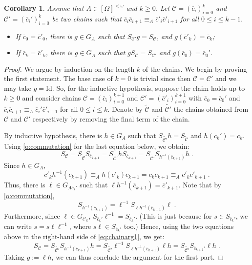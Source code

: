 \documentclass{article}
\newtheorem{corollary}[theorem]{Corollary}
\theoremstyle{remark}
\theoremstyle{definition}
\newcommand{\nn}[0]{S}%
\newcommand{\C}[0]{\mathcal{C}}
\newcommand{\fps}[1]{[#1]^{<\omega}}
\newcommand{\orq}[0]{\equiv}
\renewcommand\leq{\leqslant}
\renewcommand\geq{\geqslant}
\begin{document}
{{{{{  \begin{corollary}
  	\label{change chains} Assume that $A\in\fps{\Omega}$ and $k\geq 0$. {Let $\C=(\overline{c}_{i})_{i=0}^{k}$  and $\C'=(\overline{c}_{i}')_{i=0}^{k}$ be two chains such that $\overline{c}_{i}\overline{c}_{i+1}\orq_{A} \overline{c}'_{i}\overline{c}'_{i+1}$ for all $0\leq i\leq k-1$.}
    \begin{itemize}
     \item {If $\overline{c}_{0}=\overline{c}'_{0}$, there is $g\in G_{A}$ such that $\nn_{\C'}g=\nn_{\C}$, and $g(\overline{c}'_{k})=\overline{c}_k$;}
        \item {If $\overline{c}_{k}=\overline{c}'_{k}$, there is $g\in G_{A}$ such that $g\nn_{\C}=\nn_{\C'}$ and $g(\overline{c}_{0})=\overline{c}_0'$.}
    \end{itemize}
    
  
  \end{corollary}
  \begin{proof}
  {We argue by induction on the length $k$ of the chains. We begin by proving the first statement. The base case of $k=0$ is trivial since then $\C=\C'$ and we may take $g=\mathrm{Id}$. So, for the inductive hypothesis, suppose the claim holds up to $k\geq 0$ and consider chains $\C=(\overline{c}_{i})_{i=0}^{k+1}$ and $\C'=(\overline{c}'_{i})_{i=0}^{k+1}$ with $\overline{c}_{0}=\overline{c}_{0}'$ and $\overline{c}_{i}\overline{c}_{i+1}\orq_{A} \overline{c}_{i}'\overline{c}'_{i+1}$ for all $0\leq i\leq k$. Denote by $\tilde{\C}$ and $\tilde{\C'}$ the chains obtained from $\C$ and $\C'$ respectively by removing the final term of the chain.}
  
  {By inductive hypothesis, there is $h\in G_A$ such that $\nn_{\tilde{\C'}} h=\nn_{\tilde{\C}}$ and $h(\overline{c}_k')=\overline{c}_k$. Using \cref{o:commutation} for the last equation below, we obtain:}
\begin{equation}\label{eq:chainarg1}
\nn_{\C}=\nn_{\tilde{\C}}\nn_{\overline{c}_{k+1}}=\nn_{\tilde{\C'}}h\nn_{\overline{c}_{k+1}}=\nn_{\tilde{\C'}}\nn_{h^{-1}(\overline{c}_{k+1})}h\;.  
\end{equation}
Since $h\in G_A$,
\[\overline{c}'_k h^{-1}(\overline{c}_{k+1})\equiv_A h(\overline{c}'_k) \overline{c}_{k+1}=\overline{c}_k \overline{c}_{k+1}\equiv_A \overline{c}'_k \overline{c}'_{k+1}\;.\]
{Thus, there is $\ell\in G_{A \overline{c}_k'}$ such that $\ell h^{-1} (\overline{c}_{k+1})=\overline{c}'_{k+1}$. Note that by \cref{o:commutation},} 
\[\nn_{h^{-1}(\overline{c}_{k+1})}=\ell^{-1}\nn_{\ell h^{-1}(\overline{c}_{k+1})} \ell\;.\]
{Furthermore, since $\ell\in G_{\overline{c}'_k}$, $\nn_{\overline{c}_k'} \ell^{-1}=\nn_{\overline{c}_k'}$. (This is just because for $s\in \nn_{\overline{c}_k'}$, we can write $s=s\ell\ell^{-1}$, where $s\ell\in\nn_{\overline{c}_k'}$ too.) Hence, using the two equations above in the right-hand side of \eqref{eq:chainarg1}, we get:}
\[\nn_{\C}=\nn_{\tilde{\C'}}\nn_{h^{-1}(\overline{c}_{k+1})}h=\nn_{\tilde{\C'}}\ell^{-1}\nn_{\ell h^{-1}(\overline{c}_{k+1})} \ell h=\nn_{\tilde{\C'}}\nn_{\overline{c}_{k+1}'} \ell h\;.\]
  {Taking $g:=\ell h$, we can thus conclude the argument for the first part.}


\end{proof}}}}}}
\end{document}
